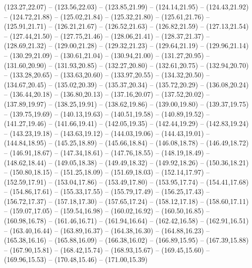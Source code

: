 {  (123.27,22.07) -- (123.56,22.03) -- (123.85,21.99) -- (124.14,21.95) -- (124.43,21.92) -- (124.72,21.88) -- (125.02,21.84) --
  (125.32,21.80) -- (125.61,21.76) -- (125.91,21.71) -- (126.21,21.67) -- (126.52,21.63) -- (126.82,21.59) -- (127.13,21.54) --
  (127.44,21.50) -- (127.75,21.46) -- (128.06,21.41) -- (128.37,21.37) -- (128.69,21.32) -- (129.00,21.28) -- (129.32,21.23) --
  (129.64,21.19) -- (129.96,21.14) -- (130.29,21.09) -- (130.61,21.04) -- (130.94,21.00) -- (131.27,20.95) -- (131.60,20.90) --
  (131.93,20.85) -- (132.27,20.80) -- (132.61,20.75) -- (132.94,20.70) -- (133.28,20.65) -- (133.63,20.60) -- (133.97,20.55) --
  (134.32,20.50) -- (134.67,20.45) -- (135.02,20.39) -- (135.37,20.34) -- (135.72,20.29) -- (136.08,20.24) -- (136.44,20.18) --
  (136.80,20.13) -- (137.16,20.07) -- (137.52,20.02) -- (137.89,19.97) -- (138.25,19.91) -- (138.62,19.86) -- (139.00,19.80) --
  (139.37,19.75) -- (139.75,19.69) -- (140.13,19.63) -- (140.51,19.58) -- (140.89,19.52) -- (141.27,19.46) -- (141.66,19.41) --
  (142.05,19.35) -- (142.44,19.29) -- (142.83,19.24) -- (143.23,19.18) -- (143.63,19.12) -- (144.03,19.06) -- (144.43,19.01) --
  (144.84,18.95) -- (145.25,18.89) -- (145.66,18.84) -- (146.08,18.78) -- (146.49,18.72) -- (146.91,18.67) -- (147.34,18.61) --
  (147.76,18.55) -- (148.19,18.49) -- (148.62,18.44) -- (149.05,18.38) -- (149.49,18.32) -- (149.92,18.26) -- (150.36,18.21) --
  (150.80,18.15) -- (151.25,18.09) -- (151.69,18.03) -- (152.14,17.97) -- (152.59,17.91) -- (153.04,17.86) -- (153.49,17.80) --
  (153.95,17.74) -- (154.41,17.68) -- (154.86,17.61) -- (155.33,17.55) -- (155.79,17.49) -- (156.25,17.43) -- (156.72,17.37) --
  (157.18,17.30) -- (157.65,17.24) -- (158.12,17.18) -- (158.60,17.11) -- (159.07,17.05) -- (159.54,16.98) -- (160.02,16.92) --
  (160.50,16.85) -- (160.98,16.78) -- (161.46,16.71) -- (161.94,16.64) -- (162.42,16.58) -- (162.91,16.51) -- (163.40,16.44) --
  (163.89,16.37) -- (164.38,16.30) -- (164.88,16.23) -- (165.38,16.16) -- (165.88,16.09) -- (166.38,16.02) -- (166.89,15.95) --
  (167.39,15.88) -- (167.90,15.81) -- (168.42,15.74) -- (168.93,15.67) -- (169.45,15.60) -- (169.96,15.53) -- (170.48,15.46) --
  (171.00,15.39)}

